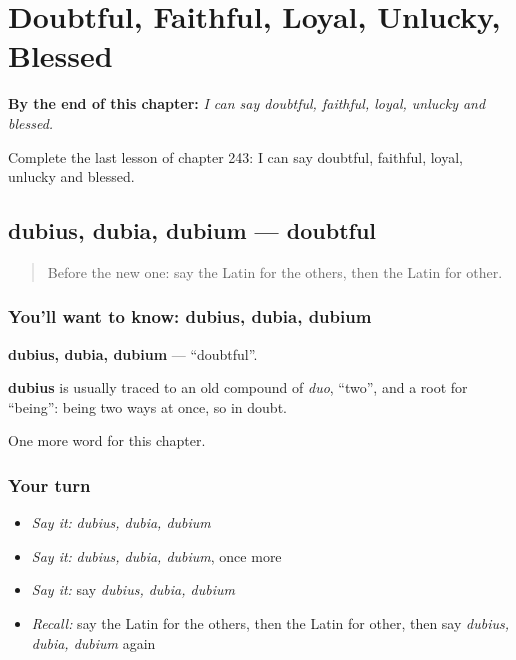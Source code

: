 
\chapter{Doubtful, Faithful, Loyal, Unlucky, Blessed}
\label{ch:la-doubtful-faithful-loyal-unlucky-blessed}

\begin{chapteropening}
\textbf{By the end of this chapter:} \emph{I can say doubtful, faithful, loyal, unlucky and blessed.}

Complete the last lesson of chapter 243: I can say doubtful, faithful, loyal, unlucky and blessed.
\end{chapteropening}

\section[dubius, dubia, dubium]{dubius, dubia, dubium — doubtful}

\label{lesson:LA-C243-dubius}



\begin{quote}
Before the new one: say the Latin for the others, then the Latin for other.
\end{quote}

\subsection*{You'll want to know: dubius, dubia, dubium}
\textbf{dubius, dubia, dubium} — \textquotedblleft{}doubtful\textquotedblright{}.

\begin{cousinweb}
\textbf{dubius} is usually traced to an old compound of \emph{duo}, \textquotedblleft{}two\textquotedblright{}, and a root for \textquotedblleft{}being\textquotedblright{}: being two ways at once, so in doubt.
\end{cousinweb}

\begin{grammarlens}[title={What you've built}]
One more word for this chapter.
\end{grammarlens}

\subsection*{Your turn}
\begin{itemize}
\raggedright
  \item \emph{Say it:} \emph{dubius, dubia, dubium}
  \item \emph{Say it:} \emph{dubius, dubia, dubium}, once more
  \item \emph{Say it:} say \emph{dubius, dubia, dubium}
  \item \emph{Recall:} say the Latin for the others, then the Latin for other, then say \emph{dubius, dubia, dubium} again
\end{itemize}

